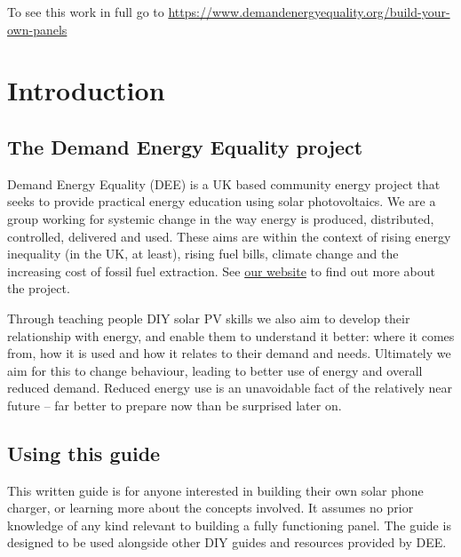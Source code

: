 \documentclass{article}
\theoremstyle{definition}
\theoremstyle{definition}
\theoremstyle{remark}
\begin{document}
    To see this work in full go to \href{https://www.demandenergyequality.org/build-your-own-panels}{https://www.demandenergyequality.org/build-your-own-panels}
  


\newpage

{\color{blue}\section{Introduction}} %
\label{sec:introduction}

  {\color{blue}\subsection{The Demand Energy Equality project}} %
  \label{sub:the_demand_energy_equality_project}

    Demand Energy Equality (DEE) is a UK based community energy project that seeks to provide practical energy education using solar photovoltaics. We are a group working for systemic change in the way energy is produced, distributed, controlled, delivered and used. These aims are within the context of rising energy inequality (in the UK, at least), rising fuel bills, climate change and the increasing cost of fossil fuel extraction. See \href{https://www.demandenergyequality.org/about/}{our website} to find out more about the project.

    Through teaching people DIY solar PV skills we also aim to develop their relationship with energy, and enable them to understand it better: where it comes from, how it is used and how it relates to their demand and needs. Ultimately we aim for this to change behaviour, leading to better use of energy and overall reduced demand. Reduced energy use is an unavoidable fact of the relatively near future – far better to prepare now than be surprised later on.

  
  {\color{blue}\subsection{Using this guide}} %
  \label{sub:using_this_guide}

    This written guide is for anyone interested in building their own solar phone charger, or learning more about the concepts involved. It assumes no prior knowledge of any kind relevant to building a fully functioning panel. The guide is designed to be used alongside other DIY guides and resources provided by DEE. 
\end{document}
